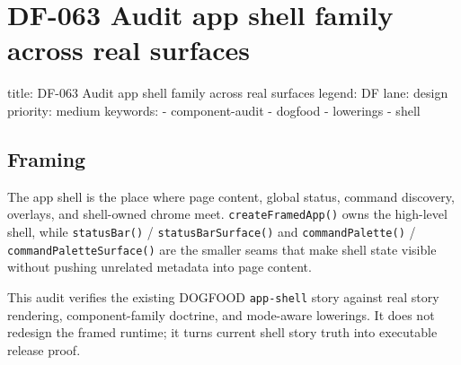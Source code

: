 \chapter{DF-063 Audit app shell family across real surfaces}\label{record-104}

\smallskip

\begin{RecordMeta}
title: DF-063 Audit app shell family across real surfaces
legend: DF
lane: design
priority: medium
keywords:
  - component-audit
  - dogfood
  - lowerings
  - shell

\end{RecordMeta}

\section{Framing}\label{record-104-framing}

The app shell is the place where page content, global status, command discovery, overlays, and shell-owned chrome meet. \texttt{c\allowbreak{}r\allowbreak{}e\allowbreak{}a\allowbreak{}t\allowbreak{}e\allowbreak{}F\allowbreak{}r\allowbreak{}a\allowbreak{}m\allowbreak{}e\allowbreak{}d\allowbreak{}A\allowbreak{}p\allowbreak{}p\allowbreak{}(\allowbreak{})} owns the high-level shell, while \texttt{s\allowbreak{}t\allowbreak{}a\allowbreak{}t\allowbreak{}u\allowbreak{}s\allowbreak{}B\allowbreak{}a\allowbreak{}r\allowbreak{}(\allowbreak{})} / \texttt{s\allowbreak{}t\allowbreak{}a\allowbreak{}t\allowbreak{}u\allowbreak{}s\allowbreak{}B\allowbreak{}a\allowbreak{}r\allowbreak{}S\allowbreak{}u\allowbreak{}r\allowbreak{}f\allowbreak{}a\allowbreak{}c\allowbreak{}e\allowbreak{}(\allowbreak{})} and \texttt{c\allowbreak{}o\allowbreak{}m\allowbreak{}m\allowbreak{}a\allowbreak{}n\allowbreak{}d\allowbreak{}P\allowbreak{}a\allowbreak{}l\allowbreak{}e\allowbreak{}t\allowbreak{}t\allowbreak{}e\allowbreak{}(\allowbreak{})} / \texttt{c\allowbreak{}o\allowbreak{}m\allowbreak{}m\allowbreak{}a\allowbreak{}n\allowbreak{}d\allowbreak{}P\allowbreak{}a\allowbreak{}l\allowbreak{}e\allowbreak{}t\allowbreak{}t\allowbreak{}e\allowbreak{}S\allowbreak{}u\allowbreak{}r\allowbreak{}f\allowbreak{}a\allowbreak{}c\allowbreak{}e\allowbreak{}(\allowbreak{})} are the smaller seams that make shell state visible without pushing unrelated metadata into page content.

This audit verifies the existing DOGFOOD \texttt{a\allowbreak{}p\allowbreak{}p\allowbreak{}-\allowbreak{}s\allowbreak{}h\allowbreak{}e\allowbreak{}l\allowbreak{}l} story against real story rendering, component-family doctrine, and mode-aware lowerings. It does not redesign the framed runtime; it turns current shell story truth into executable release proof.

